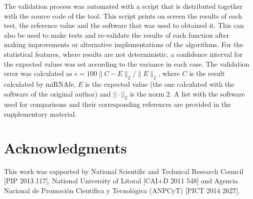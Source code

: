 \documentclass{article}
\begin{document}
The validation process was automated with a script that is distributed together with the source code of the tool. This script prints on screen the results of
each test, the reference value and the software that was used to obtained it. This can also be used to make tests and re-validate the results of each function
after making improvements or alternative implementations of the algorithms. For the statistical features, where results are not deterministic, a confidence
interval for the expected values was set according to the variance in each case. The validation error was calculated as $e = 100 \|C- E\|_{2} / \|E\|_{2}$,
where $C$ is the result calculated by miRNAfe, $E$ is the expected value (the one calculated with the software of the original author) and $||\cdot||_2$ is the
norm 2. A list with the software used for comparisons and their corresponding references are provided in the supplementary material.


\section{Acknowledgments}
This work was supported by National Scientific and Technical Research Council [PIP 2013 117], National University of Litoral [CAI+D 2011 548] and Agencia
Nacional de Promoci{\'o}n Cient{\'i}fica y Tecnol{\'o}gica (ANPCyT) [PICT 2014 2627].



\end{document}
